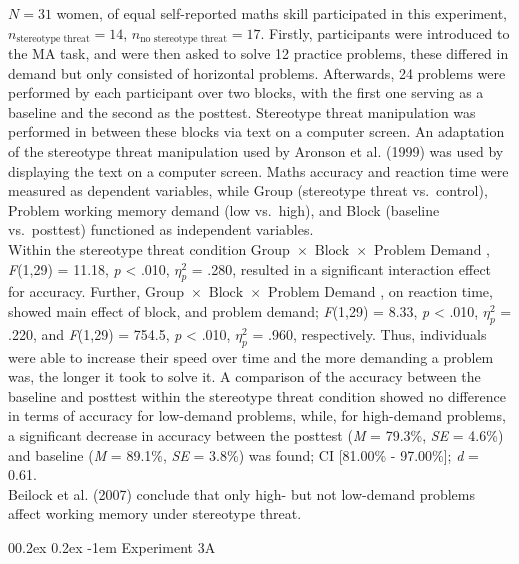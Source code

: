 \documentclass[
  stu,floatsintext]{apa7}
\makeatletter
\let\oldparagraph\paragraph
\renewcommand{\paragraph}[1]{\oldparagraph{#1}\mbox{}}
\renewcommand{\paragraph}{\@startsection{paragraph}{4}{\parindent}%
  {0\baselineskip \@plus 0.2ex \@minus 0.2ex}%
  {-1em}%
  {\normalfont\normalsize\bfseries\itshape\typesectitle}}
\renewcommand{\paragraph}{\@startsection{paragraph}{4}{\parindent}%
  {0\baselineskip \@plus 0.2ex \@minus 0.2ex}%
  {-1em}%
  {\normalfont\normalsize\bfseries\typesectitle}}
\makeatother
\begin{document}
\(N = 31\) women, of equal self-reported maths skill participated in this experiment, \(n_{\text{stereotype threat}} = 14\), \(n_{\text{no stereotype threat}} = 17\).
Firstly, participants were introduced to the MA task, and were then asked to solve 12 practice problems, these differed in demand but only consisted of horizontal problems.
Afterwards, 24 problems were performed by each participant over two blocks, with the first one serving as a baseline and the second as the posttest.
Stereotype threat manipulation was performed in between these blocks via text on a computer screen.
An adaptation of the stereotype threat manipulation used by Aronson et al. (1999) was used by displaying the text on a computer screen.
Maths accuracy and reaction time were measured as dependent variables, while Group (stereotype threat vs.~control), Problem working memory demand (low vs.~high), and Block (baseline vs.~posttest) functioned as independent variables.\\
Within the stereotype threat condition \(\text{Group } \times \text{ Block } \times \text{ Problem Demand }\), \emph{F}(1,29) = 11.18, \emph{p} \textless{} .010, \(\eta^{2}_{p}\) = .280, resulted in a significant interaction effect for accuracy.
Further, \(\text{Group } \times \text{ Block } \times \text{ Problem Demand }\), on reaction time, showed main effect of block, and problem demand; \emph{F}(1,29) = 8.33, \emph{p} \textless{} .010, \(\eta^{2}_{p}\) = .220, and \emph{F}(1,29) = 754.5, \emph{p} \textless{} .010, \(\eta^{2}_{p}\) = .960, respectively.
Thus, individuals were able to increase their speed over time and the more demanding a problem was, the longer it took to solve it.
A comparison of the accuracy between the baseline and posttest within the stereotype threat condition showed no difference in terms of accuracy for low-demand problems, while, for high-demand problems, a significant decrease in accuracy between the posttest (\emph{M} = 79.3\%, \emph{SE} = 4.6\%) and baseline (\emph{M} = 89.1\%, \emph{SE} = 3.8\%) was found; CI {[}81.00\% - 97.00\%{]}; \emph{d} = 0.61.\\
Beilock et al. (2007) conclude that only high- but not low-demand problems affect working memory under stereotype threat.

\paragraph{Experiment 3A}\label{experiment-3a}
\end{document}
